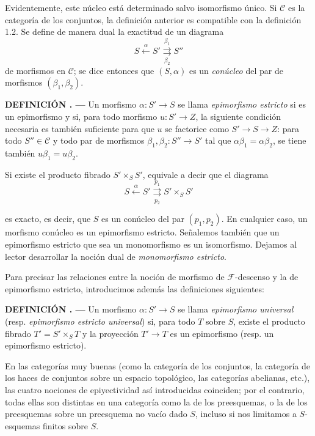\documentclass[11pt,twoside,openany]{book}
\numberwithin{equation}{section}
\newcommand{\src}[1]{%
  \phantomsection\hypertarget{src:#1}{}%
  \marginpar{\raggedleft\footnotesize\sffamily #1}%
}
\theoremstyle{plain}
\theoremstyle{definition}
\theoremstyle{remark}
\newcommand{\result}[2]{%
  \par\medskip\noindent\textbf{#1%
  \if\relax\detokenize{#2}\relax\else\space#2\fi. ---}\enspace
}
\newcommand{\FgaUnitKey}{frontmatter}
\renewcommand{\src}[1]{%
  \phantomsection\hypertarget{src:\FgaUnitKey:#1}{}%
  \marginpar{\raggedleft\footnotesize\sffamily #1}%
}
\theoremstyle{plain}
\theoremstyle{definition}
\theoremstyle{remark}
\begin{document}
Evidentemente, este núcleo está determinado salvo isomorfismo único. Si
$\mathcal C$ es la categoría de los conjuntos, la definición anterior es
compatible con la definición 1.2. Se define de manera dual la exactitud de un
diagrama
\[
  S\xleftarrow{\alpha}S'
  \overset{\beta_1}{\underset{\beta_2}{\rightrightarrows}}S''
\]
de morfismos en $\mathcal C$; se dice entonces que $(S,\alpha)$ es un
\emph{conúcleo} del par de morfismos $(\beta_1,\beta_2)$.

\result{DEFINICIÓN}{2.2} Un morfismo $\alpha:S'\longrightarrow S$ se llama
\emph{epimorfismo estricto} si es un epimorfismo y si, para todo morfismo
$u:S'\longrightarrow Z$, la siguiente condición necesaria es también
suficiente para que $u$ se factorice como
$S'\longrightarrow S\longrightarrow Z$: para todo $S''\in\mathcal C$ y todo
par de morfismos $\beta_1,\beta_2:S''\longrightarrow S'$ tal que
$\alpha\beta_1=\alpha\beta_2$, se tiene también $u\beta_1=u\beta_2$.

Si existe el producto fibrado $S'\times_S S'$, equivale a decir que el diagrama
\[
  S\xleftarrow{\alpha}S'
  \overset{p_1}{\underset{p_2}{\rightrightarrows}}S'\times_S S'
\]

\src{305}
es exacto, es decir, que $S$ es un conúcleo del par $(p_1,p_2)$. En cualquier
caso, un morfismo conúcleo es un epimorfismo estricto. Señalemos también que un
epimorfismo estricto que sea un monomorfismo es un isomorfismo. Dejamos al
lector desarrollar la noción dual de \emph{monomorfismo estricto}.

Para precisar las relaciones entre la noción de morfismo de
$\mathcal F$-descenso y la de epimorfismo estricto, introducimos además las
definiciones siguientes:

\result{DEFINICIÓN}{2.3} Un morfismo $\alpha:S'\longrightarrow S$ se llama
\emph{epimorfismo universal} (resp. \emph{epimorfismo estricto universal}) si,
para todo $T$ sobre $S$, existe el producto fibrado $T'=S'\times_ST$ y la
proyección $T'\longrightarrow T$ es un epimorfismo (resp. un epimorfismo
estricto).

En las categorías muy buenas (como la categoría de los conjuntos, la
categoría de los haces de conjuntos sobre un espacio topológico, las categorías
abelianas, etc.), las cuatro nociones de epiyectividad así introducidas
coinciden; por el contrario, todas ellas son distintas en una categoría como
la de los preesquemas, o la de los preesquemas sobre un preesquema no vacío
dado $S$, incluso si nos limitamos a $S$-esquemas finitos sobre $S$.
\end{document}
